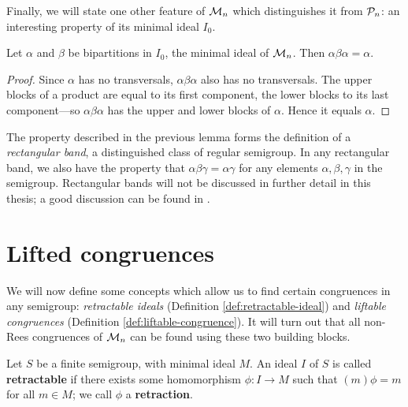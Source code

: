 Finally, we will state one other feature of $\mathcal{M}_n$ which distinguishes it from
$\mathcal{P}_n$: an interesting property of its minimal ideal $I_0$.

\begin{lemma}
  \label{lem:i0-rect-band}
  Let $\alpha$ and $\beta$ be bipartitions in $I_0$, the minimal ideal of
  $\mathcal{M}_n$.  Then $\alpha \beta \alpha = \alpha$.
  \begin{proof}
    Since $\alpha$ has no transversals, $\alpha\beta\alpha$ also has no
    transversals.  The upper blocks of a product are equal to its first
    component, the lower blocks to its last component---so $\alpha\beta\alpha$
    has the upper and lower blocks of $\alpha$.  Hence it equals $\alpha$.
  \end{proof}
\end{lemma}

The property described in the previous lemma forms the definition of a
\textit{rectangular band}, a distinguished class of regular semigroup.  In any
rectangular band, we also have the property that
$\alpha\beta\gamma = \alpha\gamma$ for any elements $\alpha,\beta,\gamma$ in the
semigroup.  Rectangular bands will not be discussed in further detail in this
thesis; a good discussion can be found in \cite[\S4.4]{howie}.

\section{Lifted congruences}
\label{sec:motzkin-prelim}
We will now define some concepts which allow us to find certain
congruences in any semigroup: \textit{retractable ideals} (Definition
\ref{def:retractable-ideal}) and \textit{liftable congruences} (Definition
\ref{def:liftable-congruence}).  It will turn out that all non-Rees congruences
of $\mathcal{M}_n$ can be found using these two building blocks.

\begin{definition}
  \label{def:retractable-ideal}
   
  Let $S$ be a finite semigroup, with minimal ideal $M$.  An ideal $I$ of $S$ is
  called \textbf{retractable} if there exists some homomorphism $\phi: I \to M$
  such that $(m)\phi = m$ for all $m \in M$; we call $\phi$ a
  \textbf{retraction}.
\end{definition}

